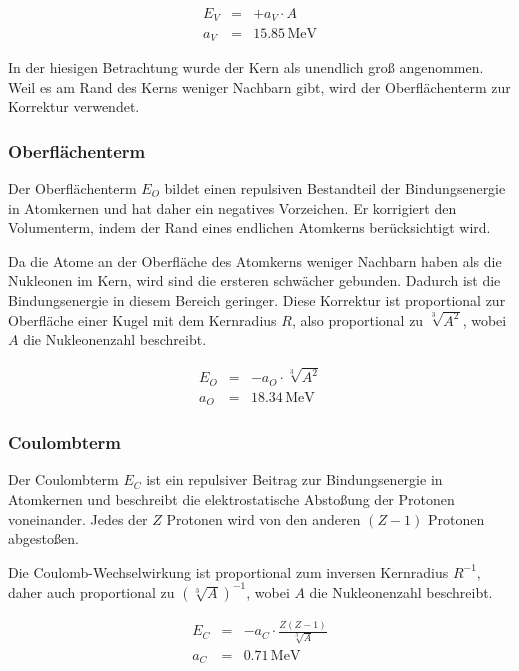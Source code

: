 \documentclass[12pt,a4paper]{scrartcl}
\numberwithin{equation}{section} %
\renewcommand{\[}{} %
\renewcommand{\]}{\noindent} %
\begin{document}
\[
\begin{eqnarray}
        E_V &=& + a_V\cdot A \\
        a_V &=& 15.85\mathrm{\,MeV}
\end{eqnarray}
\]

In der hiesigen Betrachtung wurde der Kern als unendlich groß
angenommen. Weil es am Rand des Kerns weniger Nachbarn gibt, wird der
Oberflächenterm zur Korrektur verwendet.

\hypertarget{oberfluxe4chenterm}{%
\subsubsection{Oberflächenterm}\label{oberfluxe4chenterm}}

Der Oberflächenterm $E_O$ bildet einen repulsiven Bestandteil der
Bindungsenergie in Atomkernen und hat daher ein negatives Vorzeichen. Er
korrigiert den Volumenterm, indem der Rand eines endlichen Atomkerns
berücksichtigt wird.

Da die Atome an der Oberfläche des Atomkerns weniger Nachbarn haben als
die Nukleonen im Kern, wird sind die ersteren schwächer gebunden.
Dadurch ist die Bindungsenergie in diesem Bereich geringer. Diese
Korrektur ist proportional zur Oberfläche einer Kugel mit dem Kernradius
$R$, also proportional zu $\sqrt[3]{A^2}$, wobei $A$ die
Nukleonenzahl beschreibt.

\[
\begin{eqnarray}
        E_O &=& - a_O\cdot \sqrt[3]{A^2} \\
        a_O &=& 18.34\mathrm{\,MeV}
\end{eqnarray}
\]

\hypertarget{coulombterm}{%
\subsubsection{Coulombterm}\label{coulombterm}}

Der Coulombterm $E_C$ ist ein repulsiver Beitrag zur Bindungsenergie
in Atomkernen und beschreibt die elektrostatische Abstoßung der Protonen
voneinander. Jedes der $Z$ Protonen wird von den anderen $(Z-1)$
Protonen abgestoßen.

Die Coulomb-Wechselwirkung ist proportional zum inversen Kernradius
$R^{-1}$, daher auch proportional zu $(\sqrt[3]{A})^{-1}$, wobei
$A$ die Nukleonenzahl beschreibt.

\[
\begin{eqnarray}
        E_C &=& - a_C\cdot \frac{Z(Z-1)}{\sqrt[3]{A}} \\
        a_C &=& 0.71\mathrm{\,MeV}
\end{eqnarray}
\]
\end{document}
